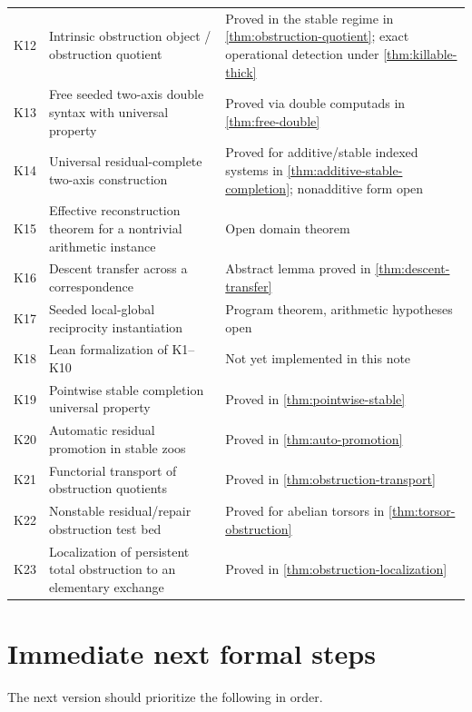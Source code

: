 \documentclass[11pt]{article}
\theoremstyle{definition}
\theoremstyle{remark}
\begin{document}
\begin{longtable}{>{\raggedright\arraybackslash}p{} >{\raggedright\arraybackslash}p{} >{\raggedright\arraybackslash}p{}}
K12 & Intrinsic obstruction object / obstruction quotient & Proved in the stable regime in \cref{thm:obstruction-quotient}; exact operational detection under \cref{thm:killable-thick}\\
K13 & Free seeded two-axis double syntax with universal property & Proved via double computads in \cref{thm:free-double}\\
K14 & Universal residual-complete two-axis construction & Proved for additive/stable indexed systems in \cref{thm:additive-stable-completion}; nonadditive form open\\
K15 & Effective reconstruction theorem for a nontrivial arithmetic instance & Open domain theorem\\
K16 & Descent transfer across a correspondence & Abstract lemma proved in \cref{thm:descent-transfer}\\
K17 & Seeded local-global reciprocity instantiation & Program theorem, arithmetic hypotheses open\\
K18 & Lean formalization of K1--K10 & Not yet implemented in this note\\
K19 & Pointwise stable completion universal property & Proved in \cref{thm:pointwise-stable}\\
K20 & Automatic residual promotion in stable zoos & Proved in \cref{thm:auto-promotion}\\
K21 & Functorial transport of obstruction quotients & Proved in \cref{thm:obstruction-transport}\\
K22 & Nonstable residual/repair obstruction test bed & Proved for abelian torsors in \cref{thm:torsor-obstruction}\\
K23 & Localization of persistent total obstruction to an elementary exchange & Proved in \cref{thm:obstruction-localization}\\
\bottomrule
\end{longtable}

\section{Immediate next formal steps}

The next version should prioritize the following in order.
\end{document}
